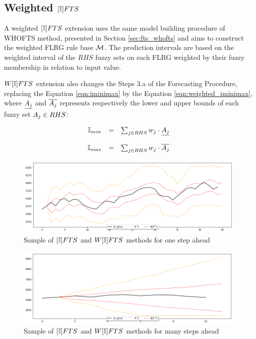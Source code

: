 %
\subsection{Weighted $[\mathbb{I}]FTS$}
\label{sec:wifts}

A weighted $[\mathbb{I}]FTS$ extension uses the same model building procedure  of WHOFTS method, presented in Section \ref{sec:fts_whofts} and aims to construct the weighted FLRG rule base $\mathcal{M}$. The prediction intervals are based on the weighted interval of the $RHS$ fuzzy sets on each FLRG weighted by their fuzzy membership in relation to input value.

$W[\mathbb{I}]FTS$ extension also changes the Steps 3.a of the Forecasting Procedure, replacing the Equation \eqref{eqn:iminimax} by the Equation \eqref{eqn:weighted_iminimax}, where $\underline{A_j}$ and $\overline{A_j}$ represents respectively the lower and upper bounds of each fuzzy set $A_j \in RHS$:

\begin{equation}
\begin{array}{ccc}
\mathbb{I}_{min} & = & \sum_{j \in RHS} w_j \cdot \underline{A_j} \\
& & \\
\mathbb{I}_{max} & = & \sum_{j \in RHS} w_j \cdot \overline{A_j}
\end{array}
\label{eqn:weighted_iminimax}
\end{equation}

\begin{figure}[htb]
    \centering
    \includegraphics[width=\textwidth]{figures/ifts_sample_onestep.png}
    \caption{Sample of $[\mathbb{I}]FTS$ and $W[\mathbb{I}]FTS$ methods for one step ahead}
    \label{fig:ifts_sample_onestep}
\end{figure}

\begin{figure}[htb]
    \centering
    \includegraphics[width=\textwidth]{figures/ifts_sample_manystep.png}
    \caption{Sample of $[\mathbb{I}]FTS$ and $W[\mathbb{I}]FTS$ methods for many steps ahead}
    \label{fig:ifts_sample_manystep}
\end{figure}

